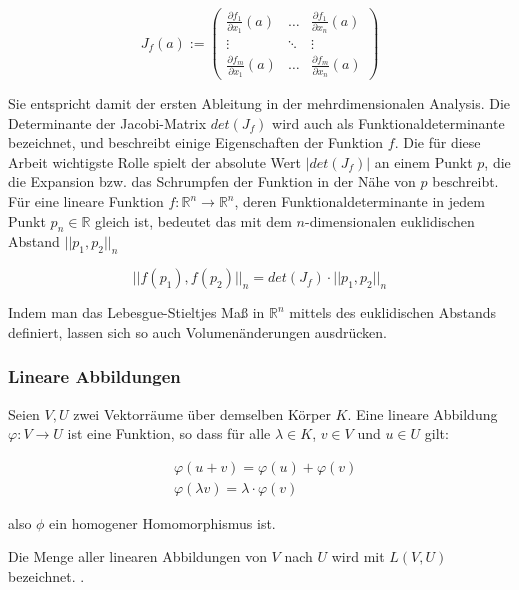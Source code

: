\documentclass[a4paper,fontsize=12pt,toc=bib,halfparskip]{scrartcl}
\begin{document}
\begin{equation}
	J_f(a) := 
	\begin{pmatrix}
		\frac{\partial f_1}{\partial x_1}(a) & \dots & \frac{\partial f_1}{\partial x_n}(a)  \\
		\vdots & \ddots & \vdots \\
		\frac{\partial f_m}{\partial x_1}(a) & \dots & \frac{\partial f_m}{\partial x_n}(a) 
	\end{pmatrix}
\end{equation}

Sie entspricht damit der ersten Ableitung in der mehrdimensionalen Analysis. Die Determinante der Jacobi-Matrix $det(J_f)$ wird auch als Funktionaldeterminante bezeichnet, und beschreibt einige Eigenschaften der Funktion $f$. Die f\"ur diese Arbeit wichtigste Rolle spielt der absolute Wert $|det(J_f)|$ an einem Punkt $p$, die die Expansion bzw. das Schrumpfen der Funktion in der N\"ahe von $p$ beschreibt.  F\"ur eine lineare Funktion $f: \mathbb{R}^n\rightarrow \mathbb{R}^n$, deren Funktionaldeterminante in jedem Punkt $p_n \in \mathbb{R}$ gleich ist, bedeutet das mit dem $n$-dimensionalen euklidischen Abstand $||p_1, p_2||_n$

\begin{equation}
	||f(p_1), f(p_2)||_n = det(J_f)\cdot||p_1, p_2||_n
\end{equation}

Indem man das Lebesgue-Stieltjes Ma{\ss} in $\mathbb{R}^n$ mittels des euklidischen Abstands definiert, lassen sich so auch Volumen\"anderungen ausdr\"ucken.

\subsubsection{Lineare Abbildungen}
Seien $V,U$ zwei Vektorr\"aume \"uber demselben K\"orper $K$. Eine lineare Abbildung $\varphi: V \rightarrow U$ ist eine Funktion, so dass f\"ur alle $\lambda \in K$, $v \in V$ und $u \in U$ gilt\cite[S.~85]{bowen2008introduction}:

\begin{equation}
\begin{split}
	&\varphi(u+v) = \varphi(u) + \varphi(v)
	\\
	&\varphi(\lambda v) = \lambda \cdot \varphi(v) 
\end{split}
\end{equation}

also $\phi$ ein homogener Homomorphismus ist.

Die Menge aller linearen Abbildungen von $V$ nach $U$ wird mit $L(V,U)$ bezeichnet. \cite[S.~97]{bowen2008introduction}.
\end{document}
